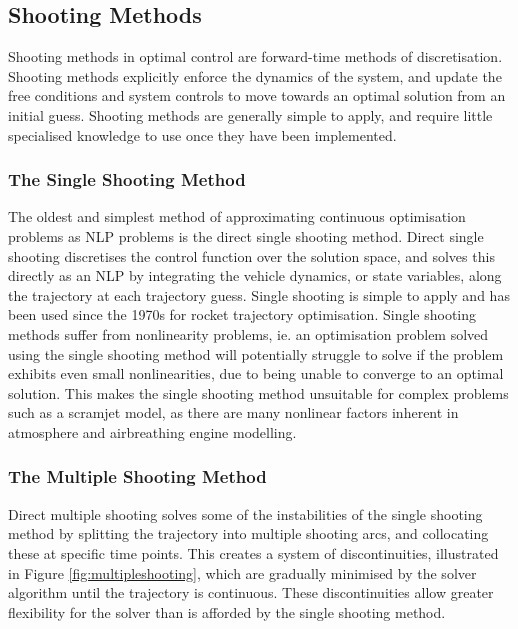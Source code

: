 \subsection{Shooting Methods}

Shooting methods in optimal control are forward-time methods of discretisation\cite{Kelly2015}. Shooting methods explicitly enforce the dynamics of the system, and update the free conditions and system controls to move towards an optimal solution from an initial guess\cite{Kelly2015}. Shooting methods are generally simple to apply, and require little specialised knowledge to use once they have been implemented. 


\subsubsection{The Single Shooting Method}

The oldest and simplest method of approximating continuous optimisation problems as NLP problems is the direct single shooting method. Direct single shooting discretises the control function over the solution space, and solves this directly as an NLP by integrating the vehicle dynamics, or state variables, along the trajectory at each trajectory guess\cite{Betts1998,Kelly2015,Rao2009,Fasano2013}. Single shooting is simple to apply and has been used since the 1970s for rocket trajectory optimisation\cite{jezewski1971}. Single shooting methods suffer from nonlinearity problems, ie. an optimisation problem solved using the single shooting method will potentially struggle to solve if the problem exhibits even small nonlinearities, due to being unable to converge to an optimal solution. This makes the single shooting method unsuitable for complex problems such as a scramjet model, as there are many nonlinear factors inherent in atmosphere and airbreathing engine modelling.


\subsubsection{The Multiple Shooting Method}

Direct multiple shooting solves some of the instabilities of the single shooting method by splitting the trajectory into multiple shooting arcs, and collocating these at specific time points\cite{Betts1998,Kelly2015,Rao2009,Fasano2013}. This creates a system of discontinuities, illustrated in Figure \ref{fig:multipleshooting}, which are gradually minimised by the solver algorithm until the trajectory is continuous. These discontinuities allow greater flexibility for the solver than is afforded by the single shooting method. 

